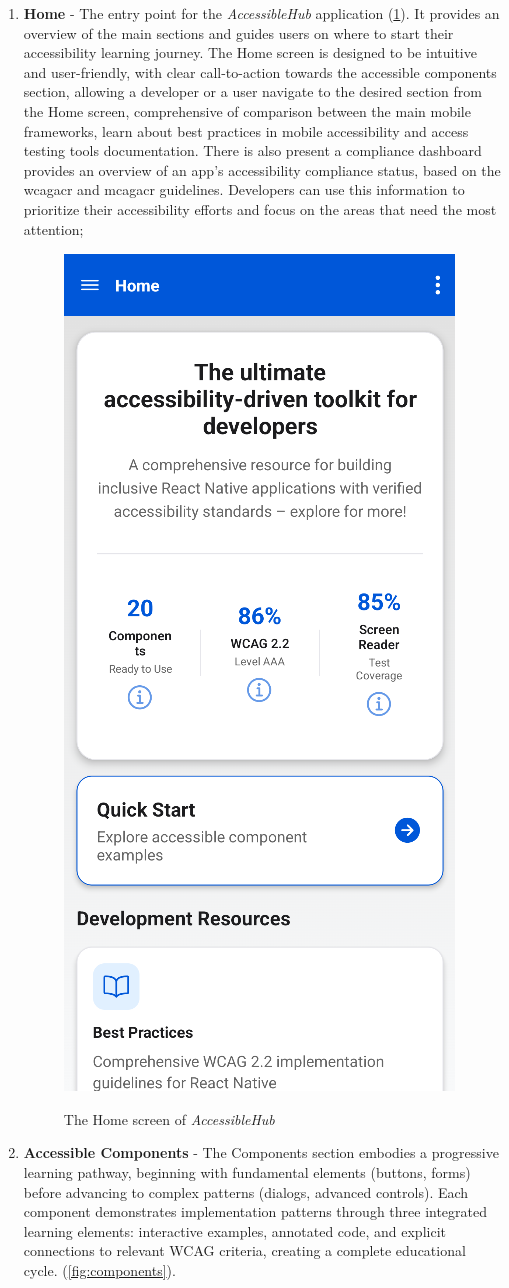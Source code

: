 \begin{enumerate}
    \item \textbf{Home} - The entry point for the \textit{AccessibleHub} application (\ref{fig:homescreen}). It provides an overview of the main sections and guides users on where to start their accessibility learning journey. The Home screen is designed to be intuitive and user-friendly, with clear call-to-action towards the accessible components section, allowing a developer or a user navigate to the desired section from the Home screen, comprehensive of comparison between the main mobile frameworks, learn about best practices in mobile accessibility and access testing tools documentation. There is also present a compliance dashboard provides an overview of an app's accessibility compliance status, based on the \acrshort{wcagacr} and \acrshort{mcagacr} guidelines. Developers can use this information to prioritize their accessibility efforts and focus on the areas that need the most attention;

    \begin{figure}[ht]
    \centering
    \includegraphics[width=0.4\linewidth, alt={Screenshot of the Home screen of AccessibleHub}]{img/homescreen.png}
    \caption{The Home screen of \textit{AccessibleHub}}\label{fig:homescreen}
    \end{figure}

\pagebreak

    \item \textbf{Accessible Components} - The Components section embodies a progressive learning pathway, beginning with fundamental elements (buttons, forms) before advancing to complex patterns (dialogs, advanced controls). Each component demonstrates implementation patterns through three integrated learning elements: interactive examples, annotated code, and explicit connections to relevant WCAG criteria, creating a complete educational cycle. (\ref{fig:components}). 


\end{enumerate}
